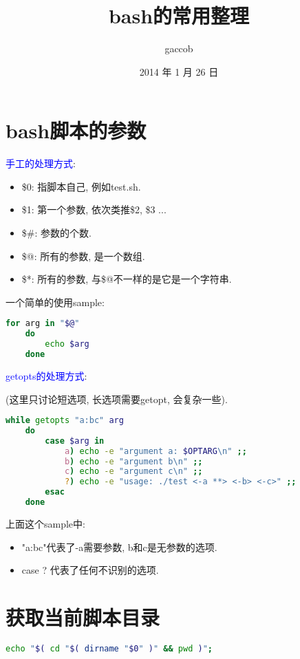 
\title {\ZHH \huge bash的常用整理}
\author {\small gaccob}
\date {\small 2014 年 1 月 26 日}
\maketitle

\section {\ZHH bash脚本的参数} {
    { \textcolor{blue}{手工的处理方式}: } \par
    \begin{itemize}
    \item {\small \$0: 指脚本自己, 例如test.sh. }
    \item {\small \$1: 第一个参数, 依次类推\$2, \$3 ... }
    \item {\small \$\#: 参数的个数. }
    \item {\small \$@: 所有的参数, 是一个数组. }
    \item {\small \$*: 所有的参数, 与\$@不一样的是它是一个字符串. }
    \end{itemize} \par
    { 一个简单的使用sample: }\par
    \gaccobsplitinv
    \begin{lstlisting}[language=bash]
    for arg in "$@"
    do
        echo $arg
    done
    \end{lstlisting}

    \gaccobsplitinv

    { \textcolor{blue}{getopts的处理方式}: }\par
    { (这里只讨论短选项, 长选项需要getopt, 会复杂一些). } \par
    \gaccobsplitinv
    \begin{lstlisting}[language=bash]
    while getopts "a:bc" arg
    do
        case $arg in
            a) echo -e "argument a: $OPTARG\n" ;;
            b) echo -e "argument b\n" ;;
            c) echo -e "argument c\n" ;;
            ?) echo -e "usage: ./test <-a **> <-b> <-c>" ;;
        esac
    done
    \end{lstlisting}
    { 上面这个sample中: }\par
    \begin{itemize}
    \item {\small "a:bc"代表了-a需要参数, b和c是无参数的选项. }
    \item {\small case ? 代表了任何不识别的选项. }
    \end{itemize}
}


\section {\ZHH 获取当前脚本目录} {
    \begin{lstlisting}[language=bash]
    echo "$( cd "$( dirname "$0" )" && pwd )";
    \end{lstlisting}
}


